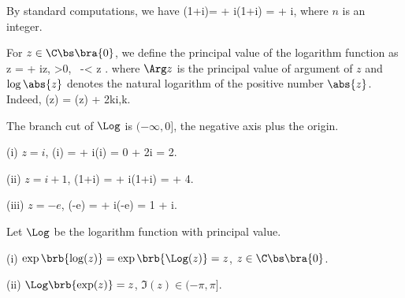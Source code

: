 \begin{example}
By standard computations, we have
\be
\log(1+i)= \log{} + i\arg(1+i) =   + i,
\ee
where $n$ is an integer.
\end{example}


\begin{definition}
For $z\in\C\bs\bra{0}$, we define the principal value of the logarithm function as
\be
\Log z = \log {} + i\Arg z, \quad {}>0, \ -\pi < \Arg z \leq \pi.
\ee
where $\Arg z$ is the principal value of argument of $z$ and $\log \abs{z}$ denotes the natural logarithm of the positive number $\abs{z}$. Indeed,
\be
\log(z) = \Log(z) + 2k\pi i,\qquad k\in \Z.
\ee

The branch cut of $\Log$ is $(-\infty,0]$, the negative axis plus the origin.
\end{definition}

\begin{example}
\ben
\item [(i)] $z=i$,
\be
\Log(i) = \log{} + i\Arg(i) = 0 + \frac {\pi}2i = 2.
\ee
\item [(ii)] $z = i+1$,
\be
\Log (1+i) = \log{} + i\Arg(1+i)  =   + 4.
\ee
\item [(iii)] $z = -e$,
\be
\Log (-e) = \log{} + i\Arg(-e) = 1 + \pi i.
\ee
\een
\end{example}

\begin{proposition}\label{pro:exp_logarithm_composition}
Let $\Log$ be the logarithm function with principal value.
\ben
\item [(i)] $\exp\brb{\log(z)} = \exp\brb{\Log(z)} = z$, $z\in \C\bs\bra{0}$.
\item [(ii)] $\Log\brb{\exp(z)} = z$, $\Im(z) \in (-\pi,\pi]$.
\een
\end{proposition}

